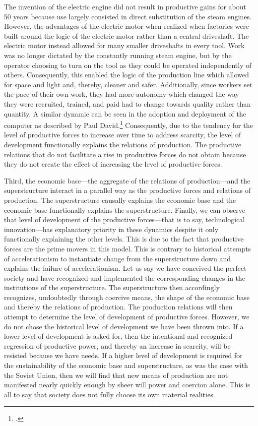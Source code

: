 \documentclass[letterpaper,notitlepage,12pt]{article}
\begin{document}
The invention of the electric engine did not result in productive gains for
about 50 years because use largely consisted in direct substitution of the steam
engines.
However, the advantages of the electric motor when realized when factories were
built around the logic of the electric motor rather than a central driveshaft.
The electric motor instead allowed for many smaller driveshafts in every tool.
Work was no longer dictated by the constantly running steam engine, but by the
operator choosing to turn on the tool as they could be operated independently of
others.
Consequently, this enabled the logic of the production line which allowed for
space and light and, thereby, cleaner and safer.
Additionally, since workers set the pace of their own work, they had more
autonomy which changed the way they were recruited, trained, and paid had to
change towards quality rather than quantity.
A similar dynamic can be seen in the adoption and deployment of the
computer as described by Paul David.\footcite{david_dynamo_1990}
Consequently, due to the tendency for the level of productive forces to increase
over time to address scarcity, the level of development functionally explains the
relations of production.
The productive relations that do not facilitate a rise in productive forces do
not obtain because they do not create the effect of increasing the level of
productive forces.

Third, the economic base---the aggregate of the relations of production---and
the superstructure interact in a parallel way as the productive forces and
relations of production.
The superstructure causally explains the economic base and the economic base
functionally explains the superstructure.
Finally, we can observe that level of development of the productive forces---that
is to say, technological innovation---has explanatory priority in these dynamics
despite it only functionally explaining the other levels.
This is due to the fact that productive forces are the prime movers in this
model.
This is contrary to historical attempts of accelerationism to instantiate change
from the superstructure down and explains the failure of accelerationism.
Let us say we have conceived the perfect society and have recognized and
implemented the corresponding changes in the institutions of the superstructure.
The superstructure then accordingly recognizes, undoubtedly through coercive
means, the shape of the economic base and thereby the relations of production.
The production relations will then attempt to determine the level of development
of productive forces.
However, we do not chose the historical level of development we have been thrown
into.
If a lower level of development is asked for, then the intentional and
recognized regression of productive power, and thereby an increase in scarcity,
will be resisted because we have needs.
If a higher level of development is required for the sustainability of the
economic base and superstructure, as was the case with the Soviet Union, then we
will find that new means of production are not manifested nearly quickly enough
by sheer will power and coercion alone.
This is all to say that society does not fully choose its own material realities.
\end{document}
